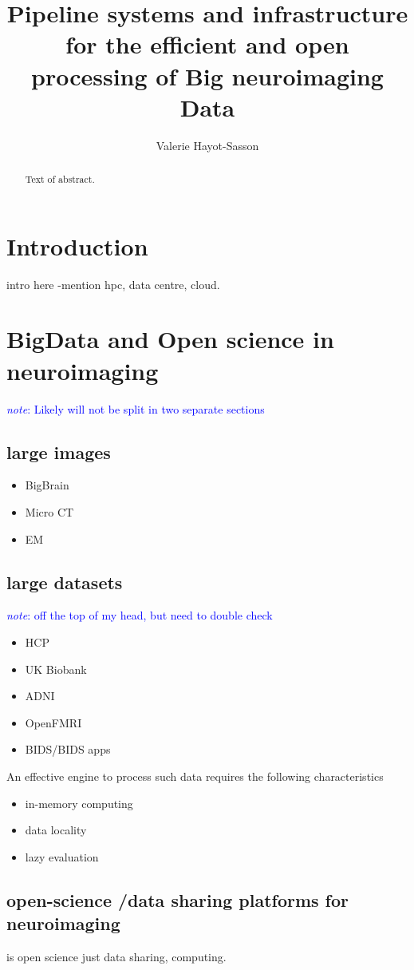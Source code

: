 \documentclass{report}
\newcommand{\note}[1]{\textcolor{blue}{\textit{note}: #1}}
\begin{document}
 \title{Pipeline systems and infrastructure for the efficient
and open processing of Big neuroimaging Data} \author{Valerie Hayot-Sasson}
\maketitle \begin{abstract} Text of abstract.  \end{abstract} \tableofcontents
    \chapter{Introduction} intro here -mention hpc, data centre, cloud.
\chapter{BigData and Open science in neuroimaging} \note{Likely will not be
split in two separate sections} \section{large images} \begin{itemize}  \item
        BigBrain \item Micro CT \item EM \end{itemize} \section{large datasets}
        \note{off the top of my head, but need to double check} \begin{itemize}
        \item HCP \item UK Biobank \item ADNI \item OpenFMRI \item BIDS/BIDS
        apps \end{itemize} An effective engine to process such data requires the
        following characteristics \begin{itemize} \item in-memory computing
        \item data locality \item lazy evaluation \end{itemize}
            \section{open-science /data sharing platforms for neuroimaging} is
            open science just data sharing, computing.
\end{document}
